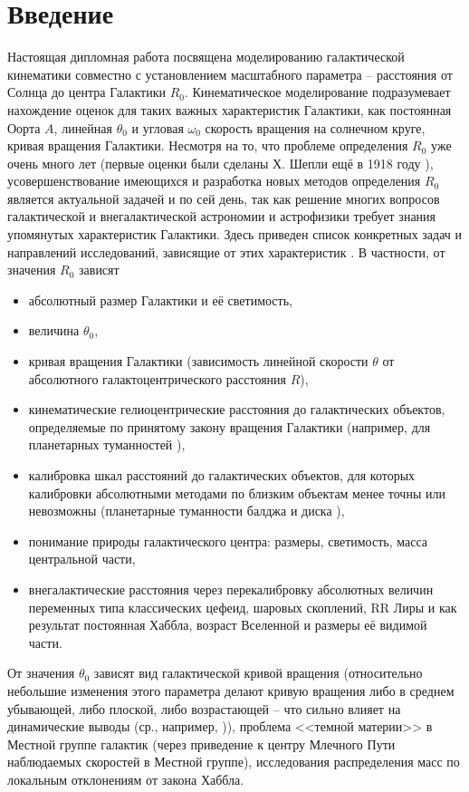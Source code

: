 \documentclass{matmex-diploma-custom}
\begin{document}
\section*{Введение}
Настоящая дипломная работа посвящена моделированию галактической кинематики совместно с установлением масштабного параметра -- расстояния от Солнца до центра Галактики $R_0$. Кинематическое моделирование подразумевает нахождение оценок для таких важных характеристик Галактики, как постоянная Оорта $A$, линейная $\theta_0$ и угловая $\omega_0$ скорость вращения на солнечном круге, кривая вращения Галактики. Несмотря на то, что проблеме определения $R_0$ уже очень много лет (первые оценки были сделаны Х. Шепли ещё в 1918 году \cite{Shapley}), усовершенствование имеющихся и разработка новых методов определения $R_0$ является актуальной задачей и по сей день, так как решение многих вопросов галактической и внегалактической астрономии и астрофизики требует знания упомянутых характеристик Галактики. Здесь приведен список конкретных задач и направлений исследований, зависящие от этих характеристик \cite{NII}. В частности, от значения $R_0$ зависят 
\begin{itemize}
        \item абсолютный размер Галактики и её светимость,
        \item величина $\theta_0$,
        \item кривая вращения Галактики (зависимость линейной скорости $\theta$ от абсолютного галактоцентрического расстояния $R$),
        \item кинематические гелиоцентрические расстояния до галактических объектов, определяемые по принятому закону вращения Галактики (например, для планетарных туманностей \cite{Acker}),
        \item калибровка шкал расстояний до галактических объектов, для которых калибровки абсолютными методами по близким объектам менее точны или невозможны (планетарные туманности балджа \cite{Steene} и диска \cite{NIIBob}),
        \item понимание природы галактического центра: размеры, светимость, масса центральной части,
        \item внегалактические расстояния через перекалибровку абсолютных величин переменных типа классических цефеид, шаровых скоплений, RR Лиры и как результат постоянная Хаббла, возраст Вселенной и размеры её видимой части. 
\end{itemize}
\par От значения $\theta_0$ зависят вид галактической кривой вращения (относительно небольшие изменения этого параметра делают кривую вращения либо в среднем убывающей, либо плоской, либо возрастающей -- что сильно влияет на динамические выводы (ср., например, \cite{Chini,Lepine,Merrifield})), проблема <<темной материи>> в Местной группе галактик (через приведение к центру Млечного Пути наблюдаемых скоростей в Местной группе), исследования распределения масс по локальным отклонениям от закона Хаббла.
\end{document}
